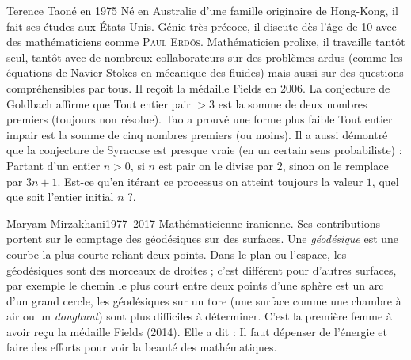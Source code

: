 \documentclass[10pt,class=article,crop=false]{standalone}
\begin{document}
\begin{multicols}{2}
\begin{biographie}{Terence Tao}{né en 1975}
Né en Australie d'une famille originaire de Hong-Kong, il fait ses études aux États-Unis.
Génie très précoce, il discute dès l'âge de 10 avec des mathématiciens comme \textsc{Paul Erdős}.
Mathématicien prolixe, il travaille tantôt seul, tantôt avec de nombreux collaborateurs sur des problèmes ardus (comme les équations de Navier-Stokes en mécanique des fluides) mais aussi sur des questions compréhensibles par tous. Il reçoit la médaille Fields en 2006.
La conjecture de Goldbach affirme que \og{}Tout entier pair $>3$ est la somme de deux nombres premiers\fg{}
(toujours non résolue). Tao a  prouvé une forme plus faible \og{}Tout entier impair est la somme de cinq nombres premiers (ou moins)\fg{}.
Il a aussi démontré que la conjecture de Syracuse est \og{}presque vraie\fg{} (en un certain sens probabiliste) :
\og{}Partant d'un entier $n>0$, si $n$ est pair on le divise par $2$, sinon on le remplace par $3n+1$. 
Est-ce qu'en itérant ce processus on atteint toujours la valeur $1$, quel que soit l'entier initial $n$ ?\fg{}.
\end{biographie}


\begin{biographie}{Maryam Mirzakhani}{1977--2017}
Mathématicienne iranienne.
Ses contributions portent sur le comptage des géodésiques sur des surfaces.
Une \emph{géodésique} est une courbe la plus courte reliant deux points. Dans le plan ou l'espace, les géodésiques sont des morceaux de droites ; c'est différent pour d'autres surfaces, par exemple le chemin le plus court entre deux points d'une sphère est un arc d'un \og{}grand cercle\fg{}, les géodésiques sur un tore (une surface comme une chambre à air ou un \emph{doughnut}) sont plus difficiles à déterminer.
C'est la première femme à avoir reçu la médaille Fields (2014). 
Elle a dit : \og{}Il faut dépenser de l'énergie et faire des efforts pour voir la beauté des mathématiques.\fg{}
\end{biographie}


\end{multicols}
\end{document}
